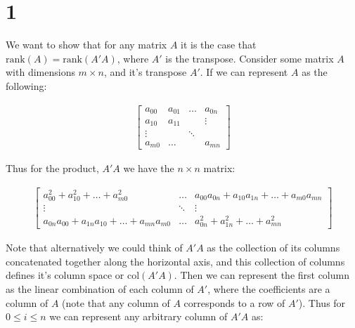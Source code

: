 \documentclass[11pt]{article} %
\newcommand{\problem}[1]{\section{#1}}		%
\begin{document}
\centerline{\LARGE\thishw}

\problem{1}
\begin{enumerate}
    We want to show that for any matrix $A$ it is the case that $\text{rank}(A) = \text{rank}(A'A)$, where $A'$ is the transpose. Consider some matrix $A$ with dimensions $m \times n$, and it's transpose $A'$. If we can represent $A$ as the following:

    \begin{align*}
        \begin{bmatrix}
            a_{00} & a_{01} & \dots  & a_{0n}  \\
            a_{10} & a_{11} &        & \vdots  \\
            \vdots  &       & \ddots &         \\
            a_{m0} & \dots  &        & a_{mn}
        \end{bmatrix}
    \end{align*}

    Thus for the product, $A'A$ we have the $n \times n$ matrix:

    \begin{align*}
        \begin{bmatrix}
            a_{00}^2 + a_{10}^2 + \dots + a_{m0}^2             & \dots  & a_{00}a_{0n} + a_{10}a_{1n} + \dots + a_{m0}a_{mn}  \\
            \vdots                                             & \ddots & \vdots \\
            a_{0n}a_{00} + a_{1n}a_{10} + \dots + a_{mn}a_{m0} & \dots  & a_{0n}^2 + a_{1n}^2 + \dots + a_{mn}^2
        \end{bmatrix}
    \end{align*}

    Note that alternatively we could think of $A'A$ as the collection of its columns concatenated together along the horizontal axis, and this collection of columns defines it's column space or $\text{col}(A'A)$. Then we can represent the first column as the linear combination of each column of $A'$, where the coefficients are a column of $A$ (note that any column of $A$ corresponds to a row of $A'$). Thus for $0 \leq i \leq n$ we can represent any arbitrary column of $A'A$ as:


\end{enumerate}
\end{document}
